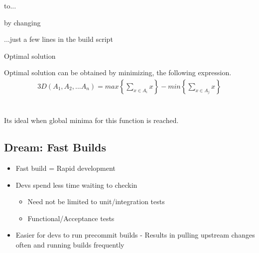 \documentclass{beamer}
\begin{document}
\begin{frame}{to...}
  \begin{centering}
    \par
  \end{centering}
\end{frame}

\begin{frame}{by changing}
  \begin{centering}
    ...just a few lines in the build script
  \end{centering}
\end{frame}

\begin{frame}{Optimal solution}
  \begin{center}
    Optimal solution can be obtained by minimizing, the following expression.\\
    \quad
    \begin{alignat}{3}
      D ( A_1, A_2, ... A_n) = max \left \{ \sum_{x \in A_i} x \right \} - min \left \{ \sum_{x \in A_j} x \right \}
    \end{alignat}\\
    \quad \\
    Its ideal when global minima for this function is reached.
  \end{center}
\end{frame}

\subsection{Dream: Fast Builds}

\begin{frame}
  \begin{centering}
    \begin{itemize}
    \item Fast build = Rapid development
      \pause
    \item Devs spend less time waiting to checkin
      \begin{itemize}
      \item Need not be limited to unit/integration tests          
      \item Functional/Acceptance tests
      \end{itemize}
      \pause
    \item Easier for devs to run precommit builds - Results in pulling upstream changes often and running builds frequently
    \end{itemize}
  \end{centering}
\end{frame}
\end{document}
